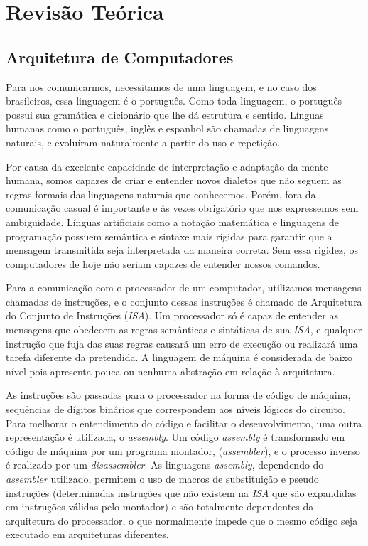 \chapter{Revisão Teórica}\label{cap_revisao}

\section{Arquitetura de Computadores}
{
    Para nos comunicarmos, necessitamos de uma linguagem, e no caso dos
    brasileiros, essa linguagem é o português. Como toda linguagem, o português
    possui sua gramática e dicionário que lhe dá estrutura e sentido. Línguas
    humanas como o português, inglês e espanhol são chamadas de linguagens
    naturais, e evoluíram naturalmente a partir do uso e
    repetição.~\cite{lyons1991natural}

    Por causa da excelente capacidade de interpretação e adaptação da mente
    humana, somos capazes de criar e entender novos dialetos que não seguem as
    regras formais das linguagens naturais que conhecemos. Porém, fora da
    comunicação casual é importante e às vezes obrigatório que nos expressemos
    sem ambiguidade. Línguas artificiais como a notação matemática e linguagens
    de programação possuem semântica e sintaxe mais rígidas para garantir que
    a mensagem transmitida seja interpretada da maneira correta. Sem essa
    rigidez, os computadores de hoje não seriam capazes de entender nossos
    comandos.
}

{
    Para a comunicação com o processador de um computador, utilizamos mensagens
    chamadas de instruções, e o conjunto dessas instruções é chamado de
    Arquitetura do Conjunto de Instruções (\textit{ISA}). Um processador só é
    capaz de entender as mensagens que obedecem as regras semânticas e
    sintáticas de sua \textit{ISA}, e qualquer instrução que fuja das suas
    regras causará um erro de execução ou realizará uma tarefa diferente da
    pretendida. A linguagem de máquina é considerada de baixo nível pois
    apresenta pouca ou nenhuma abstração em relação à arquitetura.

    As instruções são passadas para o processador na forma de código de máquina,
    sequências de dígitos binários que correspondem aos níveis lógicos do
    circuito. Para melhorar o entendimento do código e facilitar o
    desenvolvimento, uma outra representação é utilizada, o \textit{assembly}.
    Um código \textit{assembly} é transformado em código de máquina por um
    programa montador, (\textit{assembler}), e o processo inverso é realizado
    por um \textit{disassembler}. As linguagens \textit{assembly}, dependendo do
    \textit{assembler} utilizado, permitem o uso de macros de substituição e
    pseudo instruções (determinadas instruções que não existem na \textit{ISA}
    que são expandidas em instruções válidas pelo montador) e são totalmente
    dependentes da arquitetura do processador, o que normalmente impede que o
    mesmo código seja executado em arquiteturas diferentes.
}

